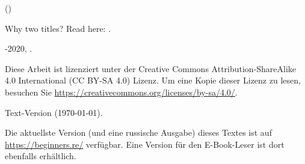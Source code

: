 \begin{titlepage}


\end{titlepage}

\newpage

\begin{center}
\vspace*{\fill}
{\LARGE \TitleMain}

\bigskip

{\large (\TitleAux)}

\bigskip
\bigskip
Why two titles? Read here: . %

\vspace*{\fill}

{\large \AUTHOR}

{\large \TT{\EMAILPRI}}
\vspace*{\fill}
\vfill

\ccbysa

-2020, \AUTHOR. 

Diese Arbeit ist lizenziert unter der Creative Commons Attribution-ShareAlike 4.0 International (CC BY-SA 4.0) Lizenz.
Um eine Kopie dieser Lizenz zu lesen, besuchen Sie \url{https://creativecommons.org/licenses/by-sa/4.0/}.

Text-Version ({\large \today}).

Die aktuellste Version (und eine russische Ausgabe) dieses Textes ist auf \url{https://beginners.re/} verfügbar.
Eine Version für den E-Book-Leser ist dort ebenfalls erhältlich.

\end{center}
